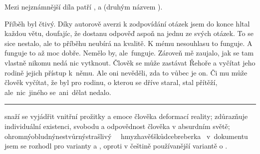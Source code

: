 \documentclass[FGBook.tex]{subfiles}
\begin{document}

\noindent 
Mezi nejznámnější díla patří , 
a  (druhým názvem ).






\noindent Příběh byl čtivý. Díky autorově averzi k zodpovídání otázek jsem do konce hltal každou větu,
doufajíc, že dostanu odpověď aspoň na jednu ze svých otázek.
To se sice nestalo, ale to příběhu neubírá na kvalitě.
K mému nesouhlasu to funguje. A funguje to až moc dobře.
Nemělo by, ale~funguje. Zároveň mě zaujalo, jak se tam vlastně nikomu nedá nic vytknout.
Člověk se může zastávat Řehoře a vyčítat jeho rodině jejich přístup k~němu.
Ale oni nevěděli, zda to vůbec je on.
Či mu může člověk vyčítat, že byl pro rodinu, o kterou se dříve staral, stal přítěží,
ale~nic~jiného se~ani~dělat nedalo.

\vfill

\noindent\begin{minipage}{\textwidth}
    {\textcolor{\wpagecolor}{\rule{\linewidth}{0.4pt}}
    \footnotesize
     snaží se vyjádřit vnitřní prožitky a emoce člověka deformací reality;
     zdůrazňuje individuální existenci, svobodu a odpovědnost člověka v absurdním světě;
     ohromný\wsl obludný\wsl nestvůrný\wsl strašlivý~
    \textbfhl{\leftrightarrow}{ }~hmyz\wsl havěť\wsl škůdce\wsl breberka
    \textbfhl{$\Rightarrow$}~v~dokumentu jsem se rozhodl pro varianty  a ,
    oproti v češtině používanější variantě o .
    }
\end{minipage}

\newpage
\end{document}
